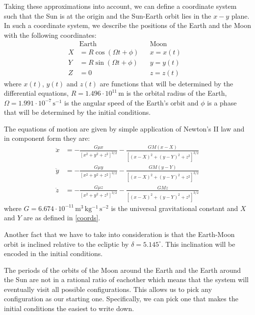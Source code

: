 \documentclass[12pt,a4paper]{article}
\begin{document}
Taking these approximations into account, we can define a coordinate system such that the Sun is at the origin and the Sun-Earth orbit lies in the $x-y$ plane. In such a coordinate system, we describe the positions of the Earth and the Moon with the following coordinates:
%
\begin{align}\label{coords}
&\text{Earth} && \text{Moon}& \nonumber \\
X &= R \cos(\Omega t + \phi) && x = x(t)& \nonumber \\
Y &= R \sin(\Omega t + \phi) && y = y(t)& \nonumber \\
Z &= 0 && z = z(t)&
\end{align}
%
where $x(t)$, $y(t)$ and $z(t)$ are functions that will be determined by the differential equations, $R = 1.496 \cdot 10^{11} \, \mathrm{m}$ is the orbital radius of the Earth, $\Omega = 1.991 \cdot 10^{-7} \, \mathrm{s^{-1}}$ is the angular speed of the Earth's orbit and $\phi$ is a phase that will be determined by the initial conditions.

The equations of motion are given by simple application of Newton's II law and in component form they are:
%
\begin{align}
\ddot{x} &= - \frac{G \mu x}{\left[x^2 + y^2 + z^2\right]^{3/2}} - \frac{G M (x - X)}{\left[(x - X)^2 + (y - Y)^2 + z^2\right]^{3/2}} \\
%
\ddot{y} &= - \frac{G \mu y}{\left[x^2 + y^2 + z^2\right]^{3/2}} - \frac{G M (y - Y)}{\left[(x - X)^2 + (y - Y)^2 + z^2\right]^{3/2}} \\
%
\ddot{z} &= - \frac{G \mu z}{\left[x^2 + y^2 + z^2\right]^{3/2}} - \frac{G M z}{\left[(x - X)^2 + (y - Y)^2 + z^2\right]^{3/2}}
\end{align}
%
where $G = 6.674 \cdot 10^{-11} \, \mathrm{m^3 \, kg^{-1} \, s^{-2}}$ is the universal gravitational constant and $X$ and $Y$ are as defined in \eqref{coords}.

Another fact that we have to take into consideration is that the Earth-Moon orbit is inclined relative to the ecliptic by $\delta = 5.145 ^{\circ}$. \cite{podatoci} This inclination will be encoded in the initial conditions.

The periods of the orbits of the Moon around the Earth and the Earth around the Sun are not in a rational ratio of eachother which means that the system will eventually visit all possible configurations. This allows us to pick any configuration as our starting one. Specifically, we can pick one that makes the initial conditions the easiest to write down.
\end{document}
